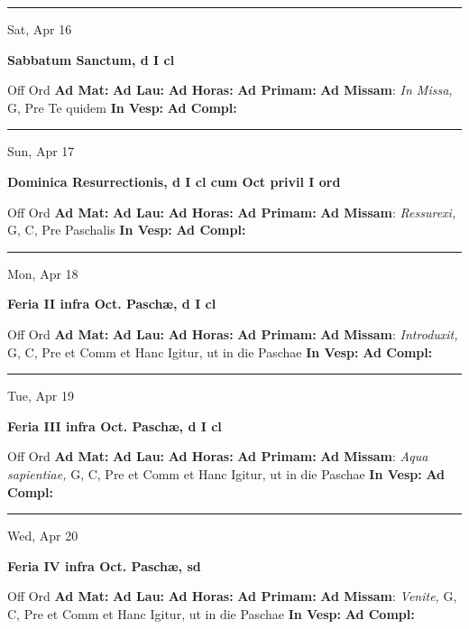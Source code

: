\documentclass[letterpaper, 10pt]{article}
\begin{document}
\hrule
\begin{center}
Sat, Apr 16
\end{center}\textbf{ \large Sabbatum Sanctum, \textnormal{\normalsize d I cl}}
\begin{justify}
Off Ord
\textbf{Ad Mat: }
\textbf{Ad Lau: }
\textbf{Ad Horas: }
\textbf{Ad Primam: }
\textbf{Ad Missam}: \textit{In Missa,} G, Pre Te quidem
\textbf{In Vesp: }
\textbf{Ad Compl: }\end{justify}



\hrule
\begin{center}
Sun, Apr 17
\end{center}\textbf{ \large Dominica Resurrectionis, \textnormal{\normalsize d I cl cum Oct privil I ord}}
\begin{justify}
Off Ord
\textbf{Ad Mat: }
\textbf{Ad Lau: }
\textbf{Ad Horas: }
\textbf{Ad Primam: }
\textbf{Ad Missam}: \textit{Ressurexi,} G, C, Pre Paschalis
\textbf{In Vesp: }
\textbf{Ad Compl: }\end{justify}



\hrule
\begin{center}
Mon, Apr 18
\end{center}\textbf{ \large Feria II infra Oct. Paschæ, \textnormal{\normalsize d I cl}}
\begin{justify}
Off Ord
\textbf{Ad Mat: }
\textbf{Ad Lau: }
\textbf{Ad Horas: }
\textbf{Ad Primam: }
\textbf{Ad Missam}: \textit{Introduxit,} G, C, Pre et Comm et Hanc Igitur, ut in die Paschae
\textbf{In Vesp: }
\textbf{Ad Compl: }\end{justify}



\hrule
\begin{center}
Tue, Apr 19
\end{center}\textbf{ \large Feria III infra Oct. Paschæ, \textnormal{\normalsize d I cl}}
\begin{justify}
Off Ord
\textbf{Ad Mat: }
\textbf{Ad Lau: }
\textbf{Ad Horas: }
\textbf{Ad Primam: }
\textbf{Ad Missam}: \textit{Aqua sapientiae,} G, C, Pre et Comm et Hanc Igitur, ut in die Paschae
\textbf{In Vesp: }
\textbf{Ad Compl: }\end{justify}



\hrule
\begin{center}
Wed, Apr 20
\end{center}\textbf{ \large Feria IV infra Oct. Paschæ, \textnormal{\normalsize sd}}
\begin{justify}
Off Ord
\textbf{Ad Mat: }
\textbf{Ad Lau: }
\textbf{Ad Horas: }
\textbf{Ad Primam: }
\textbf{Ad Missam}: \textit{Venite,} G, C, Pre et Comm et Hanc Igitur, ut in die Paschae
\textbf{In Vesp: }
\textbf{Ad Compl: }\end{justify}
\end{document}
